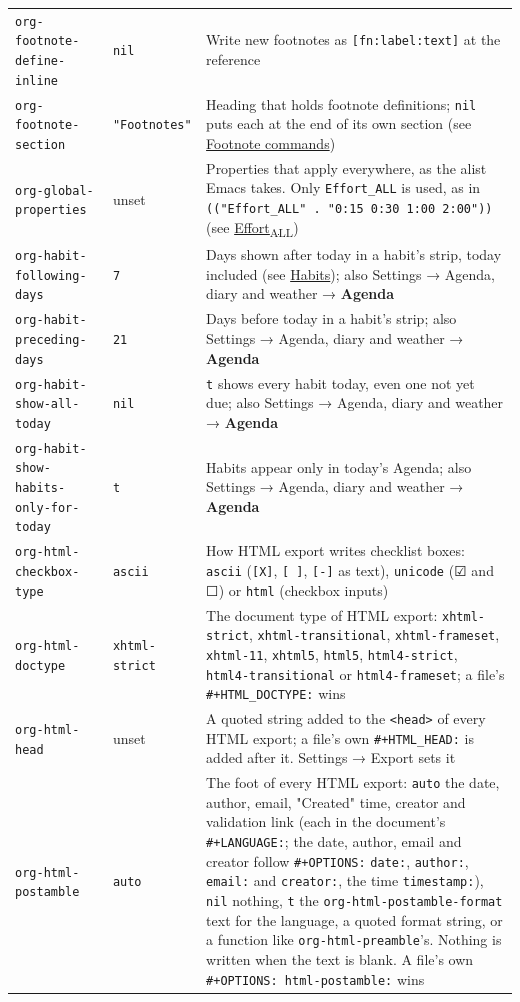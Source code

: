 \documentclass[11pt]{article}
\begin{document}
\begin{center}
\begin{tabular}{lll}
\texttt{org-footnote-define-inline} & \texttt{nil} & Write new footnotes as \texttt{[fn:label:text]} at the reference\\[0pt]
\texttt{org-footnote-section} & \texttt{"Footnotes"} & Heading that holds footnote definitions; \texttt{nil} puts each at the end of its own section (see \hyperref[sec:org83b9f5a]{Footnote commands})\\[0pt]
\texttt{org-global-properties} & unset & Properties that apply everywhere, as the alist Emacs takes. Only \texttt{Effort\_ALL} is used, as in \texttt{(("Effort\_ALL" . "0:15 0:30 1:00 2:00"))} (see \hyperref[sec:orgb982436]{Effort\textsubscript{ALL}})\\[0pt]
\texttt{org-habit-following-days} & \texttt{7} & Days shown after today in a habit's strip, today included (see \hyperref[sec:org2625440]{Habits}); also Settings → Agenda, diary and weather → \textbf{Agenda}\\[0pt]
\texttt{org-habit-preceding-days} & \texttt{21} & Days before today in a habit's strip; also Settings → Agenda, diary and weather → \textbf{Agenda}\\[0pt]
\texttt{org-habit-show-all-today} & \texttt{nil} & \texttt{t} shows every habit today, even one not yet due; also Settings → Agenda, diary and weather → \textbf{Agenda}\\[0pt]
\texttt{org-habit-show-habits-only-for-today} & \texttt{t} & Habits appear only in today's Agenda; also Settings → Agenda, diary and weather → \textbf{Agenda}\\[0pt]
\texttt{org-html-checkbox-type} & \texttt{ascii} & How HTML export writes checklist boxes: \texttt{ascii} (\texttt{[X]}, \texttt{[ ]}, \texttt{[-]} as text), \texttt{unicode} (☑ and ☐) or \texttt{html} (checkbox inputs)\\[0pt]
\texttt{org-html-doctype} & \texttt{xhtml-strict} & The document type of HTML export: \texttt{xhtml-strict}, \texttt{xhtml-transitional}, \texttt{xhtml-frameset}, \texttt{xhtml-11}, \texttt{xhtml5}, \texttt{html5}, \texttt{html4-strict}, \texttt{html4-transitional} or \texttt{html4-frameset}; a file's \texttt{\#+HTML\_DOCTYPE:} wins\\[0pt]
\texttt{org-html-head} & unset & A quoted string added to the \texttt{<head>} of every HTML export; a file's own \texttt{\#+HTML\_HEAD:} is added after it. Settings → Export sets it\\[0pt]
\texttt{org-html-postamble} & \texttt{auto} & The foot of every HTML export: \texttt{auto} the date, author, email, "Created" time, creator and validation link (each in the document's \texttt{\#+LANGUAGE:}; the date, author, email and creator follow \texttt{\#+OPTIONS:} \texttt{date:}, \texttt{author:}, \texttt{email:} and \texttt{creator:}, the time \texttt{timestamp:}), \texttt{nil} nothing, \texttt{t} the \texttt{org-html-postamble-format} text for the language, a quoted format string, or a function like \texttt{org-html-preamble}'s. Nothing is written when the text is blank. A file's own \texttt{\#+OPTIONS: html-postamble:} wins\\[0pt]

\end{tabular}
\end{center}
\end{document}
